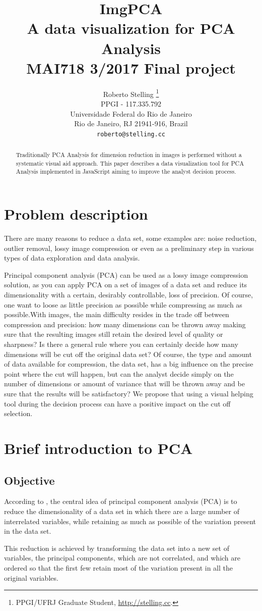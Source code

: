 \documentclass{article} %
\title{ImgPCA \\ A data visualization for PCA Analysis \\ MAI718 3/2017 Final project}
\author{Roberto Stelling \thanks{ PPGI/UFRJ Graduate Student, \href{http://stelling.cc}{http://stelling.cc}.} \\
PPGI - 117.335.792\\
Universidade Federal do Rio de Janeiro\\
Rio de Janeiro, RJ 21941-916, Brazil \\
\texttt{roberto@stelling.cc}
}
\begin{document}
\maketitle
\pagestyle{plain}

\begin{abstract}
Traditionally PCA Analysis for dimension reduction in images is performed without a systematic visual aid approach. This paper describes a data visualization tool for PCA Analysis implemented in JavaScript aiming to improve the analyst decision process.
\end{abstract}

\section{Problem description}
There are many reasons to reduce a data set, some examples are: noise reduction, outlier removal, lossy image compression or even as a preliminary step in various types of data exploration and data analysis.\par
Principal component analysis (PCA) can be used as a lossy image compression solution, as you can apply PCA on a set of images of a data set and reduce its dimensionality with a certain, desirably controllable, loss of precision. Of course, one want to loose as little precision as possible while compressing as much as possible.With images, the main difficulty resides in the trade off between compression and precision: how many dimensions can be thrown away making sure that the resulting images still retain the desired level of quality or sharpness? Is there a general rule where you can certainly decide how many dimensions will be cut off the original data set? Of course, the type and amount of data available for compression, the data set, has a big influence on the precise point where the cut will happen, but can the analyst decide simply on the number of dimensions or amount of variance that will be thrown away and be sure that the results will be satisfactory? We propose that using a visual helping tool during the decision process can have a positive impact on the cut off selection.

\section{Brief introduction to PCA}
\subsection{Objective}
According to \citet{jolliffe1986principal}, the central idea of principal component analysis (PCA) is to reduce the dimensionality of a data set in which there are a large number of interrelated variables, while retaining as much as possible of the variation present in the data set.\par
This reduction is achieved by transforming the data set into a new set of variables, the principal components, which are not correlated, and which are ordered so that the first few retain most of the variation present in all the original variables.\par
\end{document}
